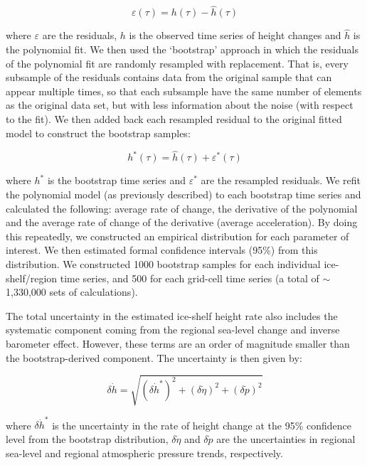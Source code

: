 \begin{equation}
  \varepsilon(\tau) = h(\tau) - \hat h(\tau)
  \label{c2e8}
\end{equation}

\noindent
where $\varepsilon$ are the residuals, $h$ is the observed time series of height changes and $\hat h$ is the polynomial fit. We then used the `bootstrap' approach \parencite{Efron1993} in which the residuals of the polynomial fit are randomly resampled with replacement. That is, every subsample of the residuals contains data from the original sample that can appear multiple times, so that each subsample have the same number of elements as the original data set, but with less information about the noise (with respect to the fit). We then added back each resampled residual to the original fitted model to construct the bootstrap samples:

\begin{equation}
  h^*(\tau) = \hat h(\tau) + \varepsilon^*(\tau)
  \label{c2e9}
\end{equation}

\noindent
where $h^*$ is the bootstrap time series and $\varepsilon^*$ are the resampled residuals. We refit the polynomial model (as previously described) to each bootstrap time series and calculated the following: average rate of change, the derivative of the polynomial and the average rate of change of the derivative (average acceleration). By doing this repeatedly, we constructed an empirical distribution for each parameter of interest. We then estimated formal confidence intervals (95\%) from this distribution. We constructed 1000 bootstrap samples for each individual ice-shelf/region time series, and 500 for each grid-cell time series (a total of $\sim$1,330,000 sets of calculations).

The total uncertainty in the estimated ice-shelf height rate also includes the systematic component coming from the regional sea-level change and inverse barometer effect. However, these terms are an order of magnitude smaller than the bootstrap-derived component. The uncertainty is then given by:

\begin{equation}
  \delta \dot h = \sqrt{
    (\delta \dot h^*)^2 + (\delta \dot \eta)^2 + (\delta \dot p)^2
    }
  \label{c2e10}
\end{equation}

\noindent
where $\delta \dot h^*$ is the uncertainty in the rate of height change at the 95\% confidence level from the bootstrap distribution, $\delta \dot \eta$ and $\delta \dot p$ are the uncertainties in regional sea-level and regional atmospheric pressure trends, respectively.


